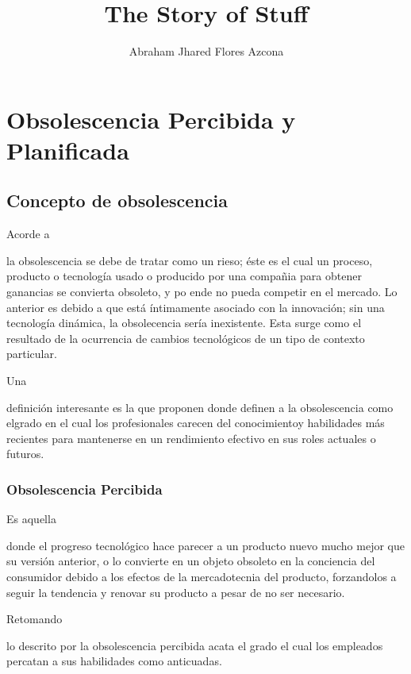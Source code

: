 \documentclass[stu, 12pt, letterpaper, donotrepeattitle, floatsintext, natbib]{apa7}
\title{\Large The Story of Stuff }
\author{Abraham Jhared Flores Azcona} %
\affiliation{Instituto Tecnológico de Tijuana}
\begin{document}
\maketitle


\renewcommand\contentsname{Contenido}
\tableofcontents
\renewcommand{\listfigurename}{Ecuaciones}
\listoffigures

\newpage
\section{Obsolescencia Percibida y Planificada}
\subsection{Concepto de obsolescencia}
Acorde a \begin{justifying}
  \cite{hallgrave-2019} %
  la obsolescencia se debe de tratar como un rieso; éste es el cual un proceso, producto o tecnología usado o producido por una 
  compañia para obtener ganancias se convierta obsoleto, y po ende no pueda competir en el mercado.
  Lo anterior es debido a que está íntimamente asociado con la innovación; sin una tecnología dinámica, la obsolecencia sería
inexistente. Esta surge como el resultado de la ocurrencia de cambios tecnológicos de un tipo de contexto particular. \citep{10.2307/1826804} %
\par
\end{justifying}
Una \begin{justifying}
  definición interesante es la que proponen \cite{article} %
  donde definen a la obsolescencia como elgrado en el cual los profesionales carecen del conocimientoy habilidades más recientes para mantenerse
  en un rendimiento efectivo en sus roles actuales o futuros.\par
\end{justifying}
\vspace{\baselineskip}
\subsubsection{Obsolescencia Percibida}
Es aquella \begin{justifying}
  donde el progreso tecnológico hace parecer a un producto nuevo mucho mejor que su versión anterior, o lo convierte en un objeto obsoleto
  en la conciencia del consumidor debido a los efectos de la mercadotecnia del producto, forzandolos a seguir la tendencia y renovar su producto a pesar
  de no ser necesario. \citep{unknown-author-no-dateA} %
  \par
\end{justifying}
Retomando \begin{justifying}
  lo descrito por \cite{article} %
la obsolescencia percibida acata el grado el cual los empleados percatan a sus habilidades como anticuadas.\par
\end{justifying}
\vspace{\baselineskip}
\end{document}
